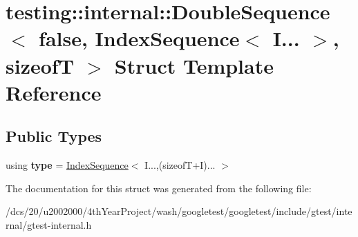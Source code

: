 \hypertarget{structtesting_1_1internal_1_1DoubleSequence_3_01false_00_01IndexSequence_3_01I_8_8_8_01_4_00_01sizeofT_01_4}{}\section{testing\+:\+:internal\+:\+:Double\+Sequence$<$ false, Index\+Sequence$<$ I... $>$, sizeofT $>$ Struct Template Reference}
\label{structtesting_1_1internal_1_1DoubleSequence_3_01false_00_01IndexSequence_3_01I_8_8_8_01_4_00_01sizeofT_01_4}
\subsection*{Public Types}
\begin{DoxyCompactItemize}
\item 
\mbox{\label{structtesting_1_1internal_1_1DoubleSequence_3_01false_00_01IndexSequence_3_01I_8_8_8_01_4_00_01sizeofT_01_4_af11568320fe19e984e2eb5ab9ad026aa}} 
using {\bfseries type} = \mbox{\hyperlink{structtesting_1_1internal_1_1IndexSequence}{Index\+Sequence}}$<$ I...,(sizeofT+I)... $>$
\end{DoxyCompactItemize}


The documentation for this struct was generated from the following file\+:\begin{DoxyCompactItemize}
\item 
/dcs/20/u2002000/4th\+Year\+Project/wash/googletest/googletest/include/gtest/internal/gtest-\/internal.\+h\end{DoxyCompactItemize}
